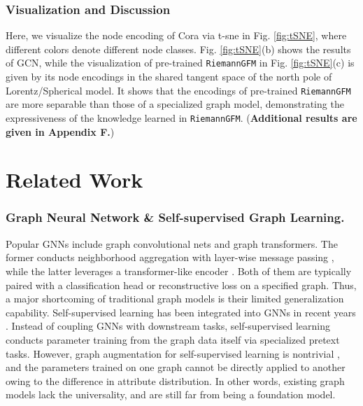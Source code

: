   \vspace{-0.05in}
\subsubsection{\textbf{Visualization and Discussion}}
Here, we visualize the node encoding of Cora via t-sne in Fig. \ref{fig:tSNE}, where different colors denote different node classes.
 Fig. \ref{fig:tSNE}(b) shows the results of GCN, while the visualization of  pre-trained \texttt{RiemannGFM} in  Fig. \ref{fig:tSNE}(c) is given by its node encodings in the shared tangent space of the north pole of Lorentz/Spherical model.
 It shows that the encodings of pre-trained \texttt{RiemannGFM} are more separable than those of a specialized graph model, demonstrating the expressiveness of the knowledge learned in \texttt{RiemannGFM}.
 (\textbf{Additional results are given in Appendix F.})


  \vspace{-0.1in}
\section{Related Work}

  \vspace{-0.03in}
\subsubsection*{\textbf{Graph Neural Network \& Self-supervised Graph Learning.}}
Popular GNNs include graph convolutional nets and graph transformers.
The former conducts neighborhood aggregation with layer-wise message passing \cite{icml19sgc,nips16cnn,nips17GraphSAGE}, while the latter leverages a transformer-like encoder \cite{arxiv22Gransformer}.
Both of them are typically paired with a classification head or reconstructive loss on a specified graph.
Thus, a major shortcoming of traditional graph models is their limited generalization capability.
Self-supervised learning has been integrated into GNNs in recent years \cite{www23graphmae2,iclr19dgi}.
Instead of coupling GNNs with downstream tasks, self-supervised learning conducts parameter training from the graph data itself via specialized pretext tasks. 
However, graph augmentation for self-supervised learning is nontrivial \cite{www2GraphAugmentation,arxiv24GraphContrastiveSurvey}, and the parameters trained on one graph cannot be directly applied to another owing to the difference in attribute distribution.
In other words, existing graph models lack the universality, and are still far from being a foundation model.


